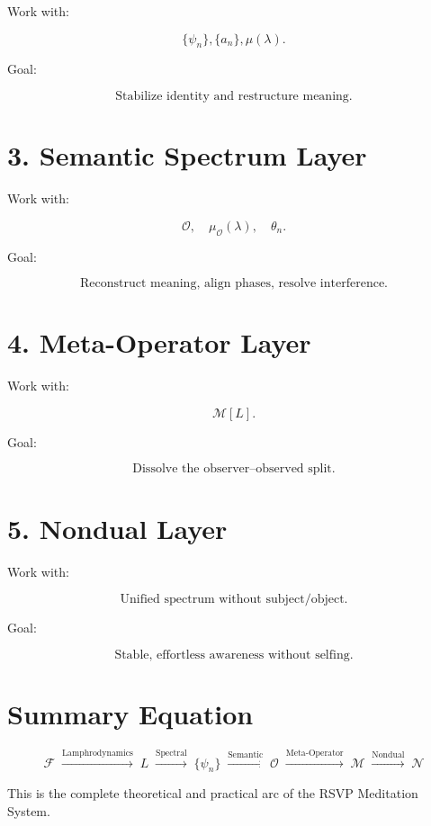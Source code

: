 \documentclass[12pt]{article}
\begin{document}
Work with:

\[
\{\psi_n\}, \{a_n\}, \mu(\lambda).
\]

Goal:

\[
\text{Stabilize identity and restructure meaning.}
\]

\section{3. Semantic Spectrum Layer}

Work with:

\[
\mathcal{O},\quad \mu_{\mathcal O}(\lambda),\quad \theta_n.
\]

Goal:

\[
\text{Reconstruct meaning, align phases, resolve interference.}
\]

\section{4. Meta-Operator Layer}

Work with:

\[
\mathcal{M}[L].
\]

Goal:

\[
\text{Dissolve the observer–observed split.}
\]

\section{5. Nondual Layer}

Work with:

\[
\text{Unified spectrum without subject/object.}
\]

Goal:

\[
\text{Stable, effortless awareness without selfing.}
\]

\section{Summary Equation}

\[
\boxed{
\mathcal{F}
\;\xrightarrow{\text{Lamphrodynamics}}\;
L
\;\xrightarrow{\text{Spectral}}\;
\{\psi_n\}
\;\xrightarrow{\text{Semantic}}\;
\mathcal{O}
\;\xrightarrow{\text{Meta-Operator}}\;
\mathcal{M}
\;\xrightarrow{\text{Nondual}}\;
\mathcal{N}
}
\]

This is the complete theoretical and practical arc of the RSVP Meditation System.

\end{document}
